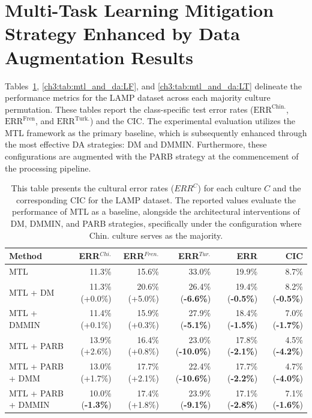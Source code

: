 \section{Multi-Task Learning Mitigation Strategy Enhanced by Data Augmentation Results}\label{ch3:sec:mtl_and_da}Tables~\ref{ch3:tab:mtl_and_da:LC}, \ref{ch3:tab:mtl_and_da:LF}, and \ref{ch3:tab:mtl_and_da:LT} delineate the performance metrics for the LAMP dataset across each majority culture permutation. 
These tables report the class-specific test error rates ($\text{ERR}^{\text{Chin.}}$, $\text{ERR}^{\text{Fren}}$, and $\text{ERR}^{\text{Turk.}}$) and the CIC. 
The experimental evaluation utilizes the MTL framework as the primary baseline, which is subsequently enhanced through the most effective DA strategies: DM and DMMIN. 
Furthermore, these configurations are augmented with the PARB strategy at the commencement of the processing pipeline.
%
%
\begin{table}
\centering
\scriptsize
\begin{tabular}{lrrrrr}
\toprule
\textbf{Method} & \textbf{ERR$^{Chi.}$} & \textbf{ERR$^{Fren.}$} & \textbf{ERR$^{Tur.}$} & \textbf{ERR} & \textbf{CIC} \\
\midrule
MTL          & 11.3\% & 15.6\% & 33.0\% & 19.9\% & 8.7\% \\
MTL + DM     & 11.3\% (+0.0\%) & 20.6\% (+5.0\%) & 26.4\% (\textbf{-6.6\%}) & 19.4\% (\textbf{-0.5\%}) & 8.2\% (\textbf{-0.5\%}) \\
MTL +  DMMIN & 11.4\% (+0.1\%) & 15.9\% (+0.3\%) & 27.9\% (\textbf{-5.1\%}) & 18.4\% (\textbf{-1.5\%}) & 7.0\% (\textbf{-1.7\%}) \\
\hline
MTL +  PARB    & 13.9\% (+2.6\%) & 16.4\% (+0.8\%) & 23.0\% (\textbf{-10.0\%}) & 17.8\% (\textbf{-2.1\%}) & 4.5\% (\textbf{-4.2\%}) \\
MTL + PARB + DMM & 13.0\% (+1.7\%) & 17.7\% (+2.1\%) & 22.4\% (\textbf{-10.6\%}) & 17.7\% (\textbf{-2.2\%}) & 4.7\% (\textbf{-4.0\%}) \\
MTL + PARB + DMMIN & 10.0\% (\textbf{-1.3\%}) & 17.4\% (+1.8\%) & 23.9\% (\textbf{-9.1\%}) & 17.1\% (\textbf{-2.8\%}) & 7.1\% (\textbf{-1.6\%}) \\
\bottomrule
\end{tabular}
\caption{This table presents the cultural error rates ($ERR^C$) for each culture $C$ and the corresponding CIC for the LAMP dataset. The reported values evaluate the performance of MTL as a baseline, alongside the architectural interventions of DM, DMMIN, and PARB strategies, specifically under the configuration where Chin. culture serves as the majority.}
\label{ch3:tab:mtl_and_da:LC}
\end{table}
